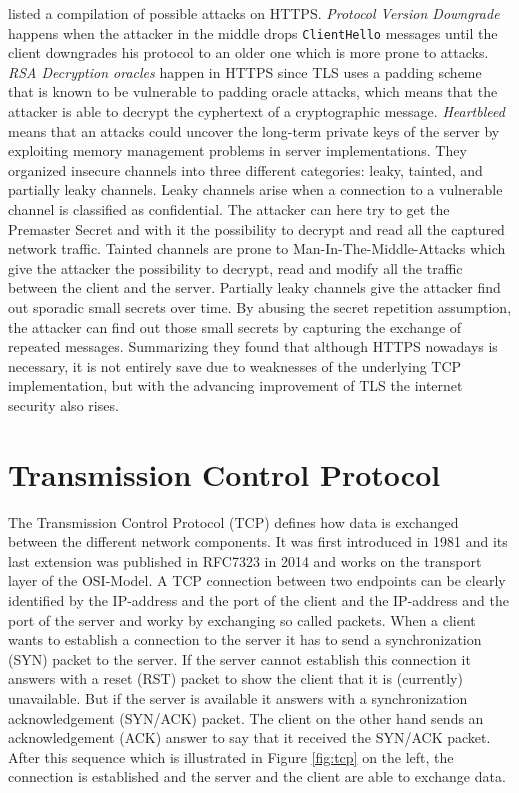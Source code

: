 \cite{calzavara2019psotcards} listed a compilation of possible attacks on HTTPS. \textit{Protocol Version Downgrade} happens when the attacker in the middle drops \texttt{ClientHello} messages until the client downgrades his protocol to an older one which is more prone to attacks. \textit{RSA Decryption oracles} happen in HTTPS since TLS uses a padding scheme that is known to be vulnerable to padding oracle attacks, which means that the attacker is able to decrypt the cyphertext of a cryptographic message. \textit{Heartbleed} means that an attacks could uncover the long-term private keys of the server by exploiting memory management problems in server implementations. They organized insecure channels into three different categories: leaky, tainted, and partially leaky channels. Leaky channels arise when a connection to a vulnerable channel is classified as confidential. The attacker can here try to get the Premaster Secret and with it the possibility to decrypt and read all the captured network traffic. Tainted channels are prone to Man-In-The-Middle-Attacks which give the attacker the possibility to decrypt, read and modify all the traffic between the client and the server. Partially leaky channels give the attacker find out sporadic small secrets over time. By abusing the secret repetition assumption, the attacker can find out those small secrets by capturing the exchange of repeated messages. Summarizing they found that although HTTPS nowadays is necessary, it is not entirely save due to weaknesses of the underlying TCP implementation, but with the advancing improvement of TLS the internet security also rises.

\section{Transmission Control Protocol} \label{tcp}
The Transmission Control Protocol (TCP) \cite{borman2014rfc7323} defines how data is exchanged between the different network components. It was first introduced in 1981 and its last extension was published in RFC7323 in 2014 and works on the transport layer of the OSI-Model. A TCP connection between two endpoints \cite{coulouris2012DistributedSystems} can be clearly identified by the IP-address and the port of the client and the IP-address and the port of the server and worky by exchanging so called packets. When a client wants to establish a connection to the server it has to send a synchronization (SYN) packet to the server. If the server cannot establish this connection it answers with a reset (RST) packet to show the client that it is (currently) unavailable. But if the server is available it answers with a synchronization acknowledgement (SYN/ACK) packet. The client on the other hand sends an acknowledgement (ACK) answer to say that it received the SYN/ACK packet. After this sequence which is illustrated in Figure \ref{fig:tcp} on the left, the connection is established and the server and the client are able to exchange data.

